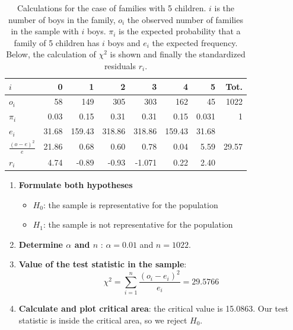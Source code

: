 \begin{table}
  \centering
  \begin{tabular}{@{}lrrrrrrr@{}}
  	\toprule
  	$i$                   &     0 &      1 &      2 &      3 &      4 &     5 &  Tot. \\
  	\midrule
  	$o_i$                 &    58 &    149 &    305 &    303 &    162 &    45 &  1022 \\
  	$\pi_i$               &  0.03 &   0.15 &   0.31 &   0.31 &   0.15 & 0.031 &     1 \\
  	$e_i$                 & 31.68 & 159.43 & 318.86 & 318.86 & 159.43 & 31.68 &       \\
  	$\frac{(o-e)^{2}}{e}$ & 21.86 &   0.68 &   0.60 &   0.78 &   0.04 &  5.59 & 29.57 \\
  	$r_i$                 &  4.74 &  -0.89 &  -0.93 & -1.071 &   0.22 &  2.40 &       \\
  	\bottomrule
  \end{tabular}
  \caption{Calculations for the case of families with 5 children. $i$ is the number of boys in the family, $o_i$ the observed number of families in the sample with $i$ boys. $\pi_i$ is the expected probability that a family of 5 children has $i$ boys and $e_i$ the expected frequency. Below, the calculation of $\chi^2$ is shown and finally the standardized residuals $r_i$.}
  \label{tab:5-children-calculations}
\end{table}

\begin{enumerate}
  \item \textbf{Formulate both hypotheses}
  
  \begin{itemize}
    \item $H_{0}$: the sample is representative for the population
    \item $H_{1}$: the sample is not representative for the population
  \end{itemize}
  \item \textbf{Determine $\alpha$ and $n$} : $\alpha = 0.01$ and $n = 1022$.
  \item \textbf{Value of the test statistic in the sample}:
  \[ \chi^{2} = \sum_{i=1}^{n} \frac{(o_{i} - e_{i})^{2}}{e_{i}} = 29.5766 \]
  \item \textbf{Calculate and plot critical area}:  the critical value is 15.0863. Our test statistic is inside the critical area, so we reject $H_{0}$. 
\end{enumerate}

